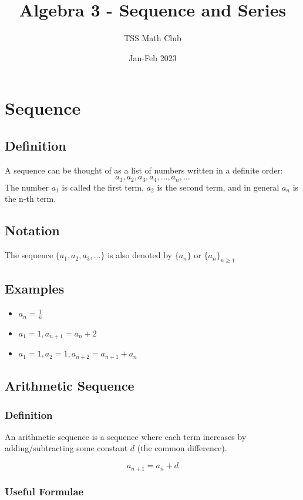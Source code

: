 \documentclass{article}
\title{Algebra 3 - Sequence and Series}
\author{TSS Math Club}
\date{Jan-Feb 2023}
\begin{document}
\large

\maketitle

\section{Sequence}

\subsection{Definition}
A sequence can be thought of as a list of numbers written in a definite order:
$$a_1, a_2, a_3, a_4,\dots , a_n, \dots$$
The number $a_1$ is called the first term, $a_2$ is the second term, and in general $a_n$ is the n-th
term.

\subsection{Notation}
The sequence $\{a_1, a_2, a_3, \dots\}$ is also denoted by $\{a_n\}$ or $\{a_n\}_{n \ge 1}$


\subsection{Examples}

\begin{itemize}
    \item $a_n = \frac{1}{n}$
    \item $a_1 = 1, a_{n+1}=a_{n}+2$
    \item $a_1=1, a_2=1, a_{n+2}=a_{n+1}+a_{n} $
\end{itemize}


\subsection{Arithmetic Sequence}

\subsubsection{Definition}

An arithmetic sequence is a sequence where each term increases by adding/subtracting some constant $d$ (the common difference).

$$a_{n+1}=a_{n}+d$$

\subsubsection{Useful Formulae}
\end{document}
